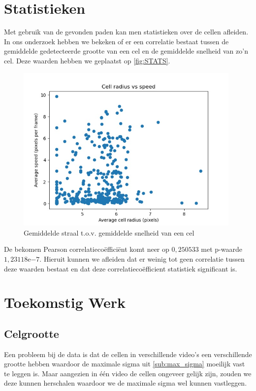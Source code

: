 \documentclass{article}
\begin{document}
\begin{multicols}{2}
\section{Statistieken}
Met gebruik van de gevonden paden kan men statistieken over de cellen afleiden. In ons onderzoek hebben we bekeken of er een correlatie bestaat tussen de gemiddelde gedetecteerde grootte van een cel en de gemiddelde snelheid van zo'n cel. Deze waarden hebben we geplaatst op \autoref{fig:STATS}.
\begin{figure}[H]
\centering
\includegraphics[width=0.98\textwidth]{images/speed.jpg}
\caption{\label{fig:STATS}Gemiddelde straal t.o.v. gemiddelde snelheid van een cel}
\end{figure}
De bekomen Pearson correlatiecoëfficiënt komt neer op $0,250533$ met p-waarde $1,23118\mathrm{e}{-7}$. Hieruit kunnen we afleiden dat er weinig tot geen correlatie tussen deze waarden bestaat en dat deze correlatiecoëfficient statistiek significant is.

\section{Toekomstig Werk}
\subsection{Celgrootte}
Een probleem bij de data is dat de cellen in verschillende video's een verschillende grootte hebben waardoor de maximale sigma uit \autoref{sub:max_sigma} moeilijk vast te leggen is.
Maar aangezien in één video de cellen ongeveer gelijk zijn, zouden we deze kunnen herschalen waardoor we de maximale sigma wel kunnen vastleggen.

\end{multicols}
\end{document}
